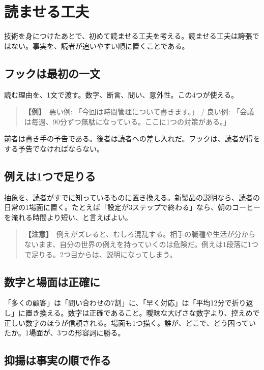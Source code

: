 \documentclass{article}
\begin{document}
\section{読ませる工夫}

技術を身につけたあとで、初めて読ませる工夫を考える。読ませる工夫は誇張ではない。事実を、読者が追いやすい順に置くことである。

\subsection{フックは最初の一文}

読む理由を、1文で渡す。数字、断言、問い、意外性。この4つが使える。

\begin{quote}
\textbf{【例】}\ 悪い例: 「今回は時間管理について書きます。」 / 良い例: 「会議は毎週、90分ずつ無駄になっている。ここに1つの対策がある。」
\end{quote}

前者は書き手の予告である。後者は読者への差し入れだ。フックは、読者が得をする予告でなければならない。

\subsection{例えは1つで足りる}

抽象を、読者がすでに知っているものに置き換える。新製品の説明なら、読者の日常の1場面に置く。たとえば「設定が3ステップで終わる」なら、朝のコーヒーを淹れる時間より短い、と言えばよい。

\begin{quote}
\textbf{【注意】}\ 例えがズレると、むしろ混乱する。相手の職種や生活が分からないまま、自分の世界の例えを持っていくのは危険だ。例えは1段落に1つで足りる。2つ目からは、説明になってしまう。
\end{quote}

\subsection{数字と場面は正確に}

「多くの顧客」は「問い合わせの7割」に、「早く対応」は「平均12分で折り返し」に置き換える。数字は正確であること。曖昧な大げさな数字より、控えめで正しい数字のほうが信頼される。場面も1つ描く。誰が、どこで、どう困っていたか。1場面が、3つの形容詞に勝る。

\subsection{抑揚は事実の順で作る}
\end{document}
